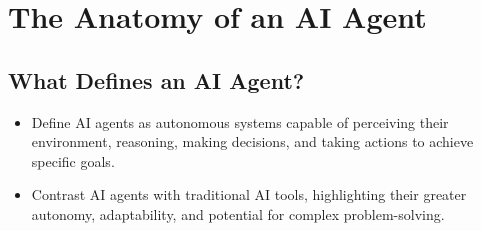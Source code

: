 \documentclass{article}
\begin{document}
\section{The Anatomy of an AI Agent}

\subsection{What Defines an AI Agent?}
\begin{itemize}
    \item Define AI agents as autonomous systems capable of perceiving their environment, reasoning, making decisions, and taking actions to achieve specific goals.
    \item Contrast AI agents with traditional AI tools, highlighting their greater autonomy, adaptability, and potential for complex problem-solving.
\end{itemize}
\end{document}
